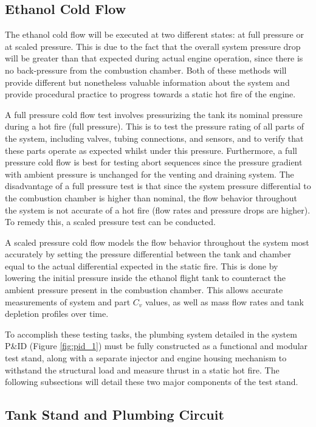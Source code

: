 \documentclass[9pt]{article} %
\numberwithin{equation}{section} %
\begin{document}
\subsection{Ethanol Cold Flow}
\hspace{\parindent} The ethanol cold flow will be executed at two different states: at full pressure or at scaled pressure. This is due to the fact that the overall system pressure drop will be greater than that expected during actual engine operation, since there is no back-pressure from the combustion chamber. Both of these methods will provide different but nonetheless valuable information about the system and provide procedural practice to progress towards a static hot fire of the engine.

A full pressure cold flow test involves pressurizing the tank its nominal pressure during a hot fire (full pressure). This is to test the pressure rating of all parts of the system, including valves, tubing connections, and sensors, and to verify that these parts operate as expected whilst under this pressure. Furthermore, a full pressure cold flow is best for testing abort sequences since the pressure gradient with ambient pressure is unchanged for the venting and draining system. The disadvantage of a full pressure test is that since the system pressure differential to the combustion chamber is higher than nominal, the flow behavior throughout the system is not accurate of a hot fire (flow rates and pressure drops are higher). To remedy this, a scaled pressure test can be conducted.

A scaled pressure cold flow models the flow behavior throughout the system most accurately by setting the pressure differential between the tank and chamber equal to the actual differential expected in the static fire. This is done by lowering the initial pressure inside the ethanol flight tank to counteract the ambient pressure present in the combustion chamber.  This allows accurate measurements of system and part $C_{v}$ values, as well as mass flow rates and tank depletion profiles over time.

To accomplish these testing tasks, the plumbing system detailed in the system P\&ID (Figure \ref{fig:pid_1}) must be fully constructed as a functional and modular test stand, along with a separate injector and engine housing mechanism to withstand the structural load and measure thrust in a static hot fire. The following subsections will detail these two major components of the test stand.

\subsection{Tank Stand and Plumbing Circuit}
\end{document}

